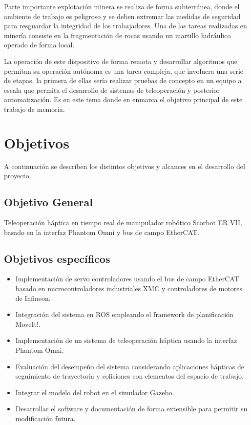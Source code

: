 Parte importante explotación minera se realiza de forma subterránea, donde el ambiente de trabajo es peligroso y se deben extremar las medidas de seguridad para resguardar la integridad de los trabajadores. Una de las tareas realizadas en minería consiste en la fragmentación de rocas usando un martillo hidráulico operado de forma local.

La operación de este dispositivo de forma remota y desarrollar algoritmos que permitan su operación autónoma es una tarea compleja, que involucra una serie de etapas, la primera de ellas sería realizar pruebas de concepto en un equipo a escala que permita el desarrollo de sistemas de teleoperación y posterior automatización. Es en este tema donde en enmarca el objetivo principal de este trabajo de memoria.

\section{Objetivos}

A continuación se describen los distintos objetivos y alcances en el desarrollo del proyecto.

\subsection{Objetivo General}

Teleoperación háptica en tiempo real de manipulador robótico Scorbot ER VII, basado en la interfaz Phantom Omni y bus de campo EtherCAT.

\subsection{Objetivos específicos}

\begin{itemize}

\item Implementación de servo controladores usando el bus de campo EtherCAT basado en microcontroladores industriales XMC y controladores de motores de Infineon.

\item Integración del sistema en ROS empleando el framework de planificación MoveIt!.

\item Implementación de un sistema de teleoperación háptica usando la interfaz Phantom Omni.

\item Evaluación del desempeño del sistema considerando aplicaciones hápticas de seguimiento de trayectoria y colisiones con elementos del espacio de trabajo.

\item Integrar el modelo del robot en el simulador Gazebo.

\item Desarrollar el software y documentación de forma extensible para permitir su modificación futura.

\end{itemize}


